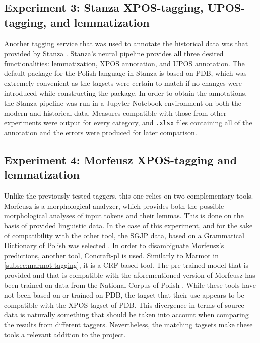 \subsection{Experiment 3: Stanza XPOS-tagging, UPOS-tagging, and lemmatization}
\label{subsec:stanza-tagging}

Another tagging service that was used to annotate the historical data was that provided by Stanza \citep{manning-etal-2014-stanford, qi2020stanza}. Stanza's neural pipeline provides all three desired functionalities: lemmatization, XPOS annotation, and UPOS annotation. The default package for the Polish language in Stanza is based on PDB, which was extremely convenient as the tagsets were certain to match if no changes were introduced while constructing the package. In order to obtain the annotations, the Stanza pipeline was run in a Jupyter Notebook environment on both the modern and historical data. Measures compatible with those from other experiments were output for every category, and \texttt{.xlsx} files containing all of the annotation and the errors were produced for later comparison.

\subsection{Experiment 4: Morfeusz XPOS-tagging and lemmatization}
\label{subsec:morfeusz-tagging}

Unlike the previously tested taggers, this one relies on two complementary tools. Morfeusz is a morphological analyzer, which provides both the possible morphological analyses of input tokens and their lemmas. This is done on the basis of provided linguistic data. In the case of this experiment, and for the sake of compatibility with the other tool, the SGJP data, based on a Grammatical Dictionary of Polish was selected \citep{sal:etal:15, kie:wol:17:morf}. In order to disambiguate Morfeusz's predictions, another tool, Concraft-pl is used. Similarly to Marmot in \autoref{subsec:marmot-tagging}, it is a CRF-based tool. The pre-trained model that is provided and that is compatible with the aforementioned version of Morfeusz has been trained on data from the National Corpus of Polish \citep{nkjp, waszczuk-2012-harnessing, waszczuk2018morphosyntactic}. While these tools have not been based on or trained on PDB, the tagset that their use appears to be compatible with the XPOS tagset of PDB. This divergence in terms of source data is naturally something that should be taken into account when comparing the results from different taggers. Nevertheless, the matching tagsets make these tools a relevant addition to the project.

